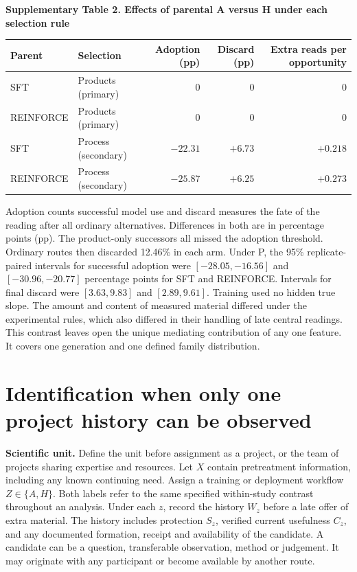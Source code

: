 \documentclass[11pt,a4paper]{article}
\newcommand{\lead}[1]{\textbf{#1}\enspace}
\newcommand{\tabhead}[2]{\par\Needspace{11\baselineskip}\smallskip\noindent\textbf{Supplementary Table #1. #2}\par\nobreak\smallskip}
\begin{document}
\tabhead{2}{Effects of parental A versus H under each selection rule}
\begin{center}\small
\begin{tabular}{@{}llrrr@{}}
\toprule
Parent & Selection & Adoption (pp) & Discard (pp) & Extra reads per opportunity\\
\midrule
SFT & Products (primary) & 0 & 0 & 0\\
REINFORCE & Products (primary) & 0 & 0 & 0\\
SFT & Process (secondary) & $-22.31$ & $+6.73$ & $+0.218$\\
REINFORCE & Process (secondary) & $-25.87$ & $+6.25$ & $+0.273$\\
\bottomrule
\end{tabular}
\end{center}
Adoption counts successful model use and discard measures the fate of the reading after all ordinary alternatives. Differences in both are in percentage points (pp). The product-only successors all missed the adoption threshold. Ordinary routes then discarded 12.46\% in each arm. Under P, the 95\% replicate-paired intervals for successful adoption were $[-28.05,-16.56]$ and $[-30.96,-20.77]$ percentage points for SFT and REINFORCE. Intervals for final discard were $[3.63,9.83]$ and $[2.89,9.61]$. Training used no hidden true slope. The amount and content of measured material differed under the experimental rules, which also differed in their handling of late central readings. This contrast leaves open the unique mediating contribution of any one feature. It covers one generation and one defined family distribution.

\section{Identification when only one project history can be observed}\label{sec:theory}
\lead{Scientific unit.} Define the unit before assignment as a project, or the team of projects sharing expertise and resources. Let $X$ contain pretreatment information, including any known continuing need. Assign a training or deployment workflow $Z\in\{A,H\}$. Both labels refer to the same specified within-study contrast throughout an analysis. Under each $z$, record the history $W_z$ before a late offer of extra material. The history includes protection $S_z$, verified current usefulness $C_z$, and any documented formation, receipt and availability of the candidate. A candidate can be a question, transferable observation, method or judgement. It may originate with any participant or become available by another route.
\end{document}
